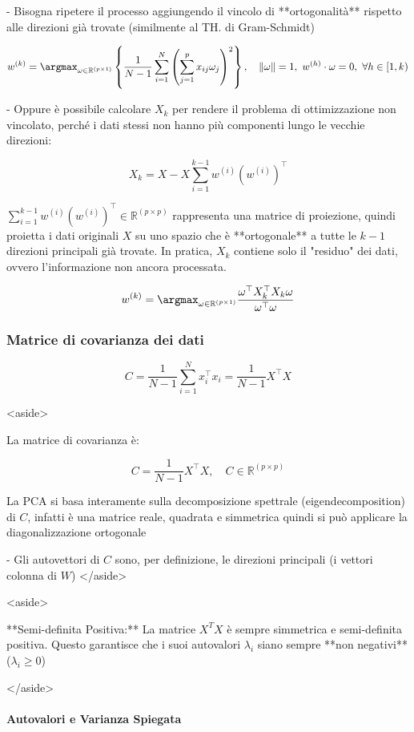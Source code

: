 - Bisogna ripetere il processo aggiungendo il vincolo di **ortogonalità** rispetto alle direzioni già trovate (similmente al TH. di Gram-Schmidt)

$$
w^{(k)} = \argmax_{\omega\in \mathbb{R}^{(p\times1)}} \left\{ \frac{1}{N-1} \sum_{i=1}^{N} \left( \sum_{j=1}^{p} x_{ij} \omega_j \right)^2 \right\},\quad \|\omega\|=1,\ w^{(h)}\cdot\omega=0,\ \forall h\in[1,k)
$$

- Oppure è possibile calcolare $X_k$ per rendere il problema di ottimizzazione non vincolato, perché i dati stessi non hanno più componenti lungo le vecchie direzioni:

$$
X_{k}=X-X\sum_{i=1}^{k-1}w^{(i)}(w^{(i)})^{\top}
$$

$\sum_{i=1}^{k-1}w^{(i)}(w^{(i)})^{\top}\in \mathbb{R}^{(p\times p)}$ rappresenta una matrice di proiezione, quindi proietta i dati originali $X$ su uno spazio che è **ortogonale** a tutte le $k-1$ direzioni principali già trovate. In pratica, $X_k$ contiene solo il "residuo" dei dati, ovvero l'informazione non ancora processata.

$$
w^{(k)}=\argmax_{\omega\in\mathbb{R}^{(p\times1)}}\frac{\omega^{\top}X_{k}^{\top}X_{k}\omega}{\omega^{\top}\omega}
$$


\subsubsection{Matrice di covarianza dei dati}

$$
C = \frac{1}{N-1} \sum_{i=1}^{N} x_i^\top x_i = \frac{1}{N-1} X^\top X
$$

<aside>


La matrice di covarianza è:

$$
C = \frac{1}{N-1} X^\top X,\quad C\in\mathbb{R}^{(p\times p)}
$$

La PCA si basa interamente sulla decomposizione spettrale (eigendecomposition) di $C$, infatti è una matrice reale, quadrata e simmetrica quindi si può applicare la diagonalizzazione ortogonale

- Gli autovettori di $C$ sono, per definizione, le direzioni principali (i vettori colonna di $W$)
</aside>

<aside>


**Semi-definita Positiva:** La matrice $X^TX$ è sempre simmetrica e semi-definita positiva. Questo garantisce che i suoi autovalori $\lambda_i$ siano sempre **non negativi** ($\lambda_i \ge 0$)

</aside>

\paragraph{Autovalori e Varianza Spiegata}


